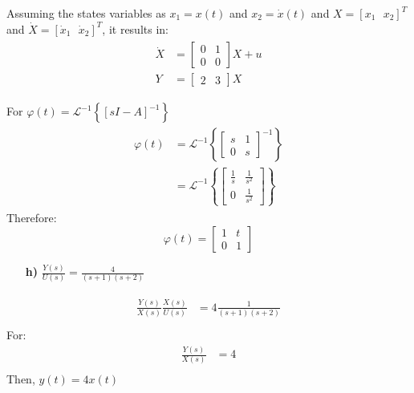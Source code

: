 \documentclass{article}
\begin{document}
Assuming the states variables as $x_1 = x(t)$ and $x_2 = \dot{x}(t)$ and $X = [x_1\:\:\:x_2]^T$ and $\dot{X} = [\dot{x}_1\:\:\:\dot{x}_2]^T$, it results in:
\begin{eqnarray*}
\begin{split}
\dot{X} &= 
\begin{bmatrix}
0 & 1 \\
0 & 0
\end{bmatrix} X + u \\ Y &= 
\begin{bmatrix}
2 & 3
\end{bmatrix} X
\end{split}
\end{eqnarray*}

For $\varphi(t) = \mathcal{L}^{-1} \left\lbrace \left[sI-A \right]^{-1} \right\rbrace $
\begin{eqnarray*}
\begin{split}
\varphi(t) &= \mathcal{L}^{-1} \left\lbrace 
\begin{bmatrix}
s & 1 \\
0 & s
\end{bmatrix} ^{-1} \right\rbrace \\ &= \mathcal{L}^{-1} \left\lbrace 
\begin{bmatrix}
\frac{1}{s} & \frac{1}{s^2} \\
0 & \frac{1}{s^2}
\end{bmatrix} \right\rbrace
\end{split}
\end{eqnarray*}
Therefore:
$$ \varphi(t) = 
\begin{bmatrix}
1 & t \\
0 & 1
\end{bmatrix}
$$

\begin{enumerate}[]
\item[\textbf{h)}] $ \frac{Y(s)}{U(s)} = \frac{4}{(s+1)(s+2)} $
\end{enumerate}
\begin{eqnarray*}
\begin{split}
	\frac{Y(s)}{X(s)}\frac{X(s)}{U(s)} &= 4\frac{1}{(s+1)(s+2)} \\
\end{split}
\end{eqnarray*}
For:
\begin{eqnarray*}
	\frac{Y(s)}{X(s)} &= 4\\
\end{eqnarray*}
Then, $ y(t) = 4x(t) $
\end{document}
